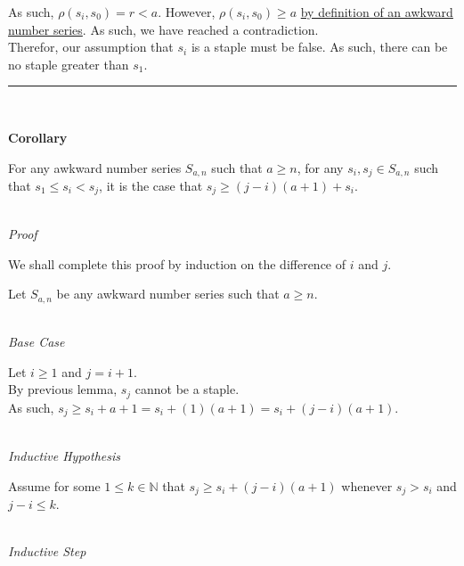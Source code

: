 \documentclass[a4paper,12pt]{article}
\begin{document}
\noindent As such, $\rho(s_i, s_0) = r < a$. However, $\rho(s_i, s_0) \geq a$ \hyperlink{definition:awkward_number_series}{by definition of an awkward number series}. As such, we have reached a contradiction.\\

\noindent Therefor, our assumption that $s_i$ is a staple must be false. As such, there can be no staple greater than $s_1$.


\begin{center}
\noindent\rule{8cm}{0.4pt}
\end{center}
\noindent \\







\label{lemma:min_length_one_staple}
\hypertarget{lemma:min_length_one_staple}{}
\begin{tcolorbox}
\textbf{Corollary}

\noindent For any awkward number series $S_{a,n}$ such that $a \geq n$, for any $s_i, s_j \in S_{a, n}$ such that $s_1 \leq s_i < s_j$, it is the case that $s_j \geq (j - i)(a + 1) + s_i$.

\end{tcolorbox}

\noindent \\
\textit{Proof}

\noindent We shall complete this proof by induction on the difference of $i$ and $j$.

\noindent Let $S_{a, n}$ be any awkward number series such that $a \geq n$.

\noindent \\
\textit{Base Case}

\noindent Let $i \geq 1$ and $j = i + 1$.\\

\noindent By previous lemma, $s_j$ cannot be a staple.\\

\noindent As such, $s_j \geq s_i + a + 1 = s_i + (1)(a + 1) = s_i + (j - i)(a + 1)$.


\noindent \\
\textit{Inductive Hypothesis}

\noindent Assume for some $1 \leq k \in \mathbb{N}$ that $s_j \geq s_i + (j - i)(a + 1)$ whenever $s_j > s_i$ and $j - i \leq k$.


\noindent \\
\textit{Inductive Step}
\end{document}
